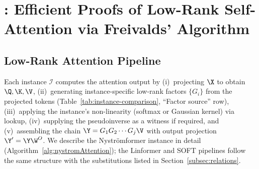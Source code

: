 \section{\name: Efficient Proofs of Low-Rank Self-Attention via Freivalds' Algorithm}
\label{sec:protocol}

\subsection{Low-Rank Attention Pipeline}\label{subsec:nystrom-attention}
Each instance $\mathcal{I}$ computes the attention output by (i)~projecting $\X$ to obtain $\Q,\K,\V$, (ii)~generating instance-specific low-rank factors $\{G_i\}$ from the projected tokens (Table~\ref{tab:instance-comparison}, ``Factor source'' row), (iii)~applying the instance's non-linearity (softmax or Gaussian kernel) via lookup, (iv)~supplying the pseudoinverse as a witness if required, and (v)~assembling the chain $\Y = G_1 G_2 \cdots G_j \V$ with output projection $\Y' = \Y \W^O$.
We describe the Nystr\"{o}mformer instance in detail (Algorithm~\ref{alg:nystromAttention}); the Linformer and SOFT pipelines follow the same structure with the substitutions listed in Section~\ref{subsec:relations}.


